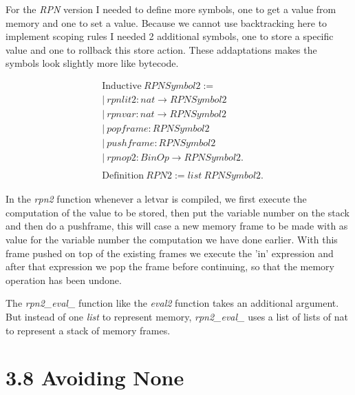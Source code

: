 \documentclass[10pt,a4paper,usenames,dvipnames]{article}
\begin{document}
For the \emph{RPN} version I needed to define more symbols, one to get a value from memory and one to set a value. Because we cannot use backtracking here to implement scoping rules I needed 2 additional symbols, one to store a specific value and one to rollback this store action. These addaptations makes the symbols look slightly more like bytecode.

\begin{align*}
& \text{Inductive} \: RPNSymbol2 := \\
& | \: rpnlit2 : nat \rightarrow RPNSymbol2 \\
& | \: rpnvar : nat \rightarrow RPNSymbol2 \\
& | \: popframe : RPNSymbol2 \\
& | \: pushframe : RPNSymbol2 \\
& | \: rpnop2 : BinOp \rightarrow RPNSymbol2. \\
\\
& \text{Definition} \: RPN2 := list \: RPNSymbol2. 
\end{align*}

In the \emph{rpn2} function whenever a letvar is compiled, we first execute the computation of the value to be stored, then
put the variable number on the stack and then do a pushframe, this will case a new memory frame to be made with as value for the variable number the computation we have done earlier. With this frame pushed on top of the existing frames we execute the 'in' expression and after that expression we pop the frame before continuing, so that the memory operation has been undone.

The \emph{rpn2\_eval\_} function like the \emph{eval2} function takes an additional argument. But instead of one \emph{list} to represent memory, \emph{rpn2\_eval\_} uses a list of lists of nat to represent a stack of memory frames.

\section*{3.8 Avoiding None }
\end{document}
